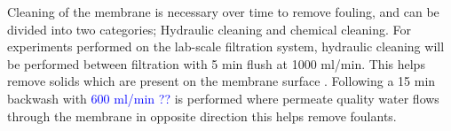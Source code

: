 Cleaning of the membrane is necessary over time to remove fouling, and can be divided into two categories; Hydraulic cleaning and chemical cleaning. \citep{NXfiltration_operation_manual} 
For experiments performed on the lab-scale filtration system, hydraulic cleaning will be performed between filtration with 5 min flush at 1000 ml/min. 
This helps remove solids which are present on the membrane surface \citep{NXfiltration_operation_manual}.  
Following a 15 min backwash with \textcolor{blue}{600 ml/min ??} is performed where permeate quality water flows through the membrane in opposite direction this helps remove foulants. \citep{NXfiltration_operation_manual}




